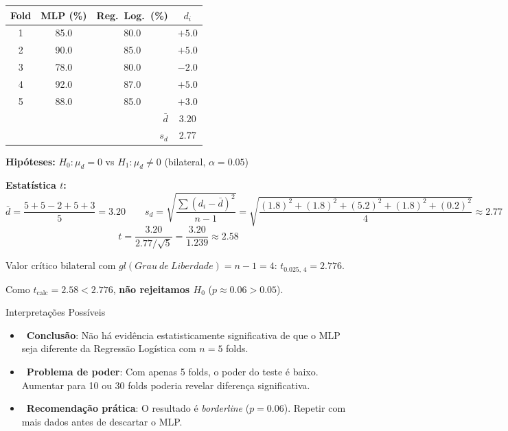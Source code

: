 \documentclass[12pt,a4paper]{article}
\begin{document}
\begin{center}
\begin{tabular}{cccc}
\toprule
Fold & MLP (\%) & Reg.\ Log.\ (\%) & $d_i$ \\
\midrule
1 & 85{.}0 & 80{.}0 & $+5{.}0$ \\
2 & 90{.}0 & 85{.}0 & $+5{.}0$ \\
3 & 78{.}0 & 80{.}0 & $-2{.}0$ \\
4 & 92{.}0 & 87{.}0 & $+5{.}0$ \\
5 & 88{.}0 & 85{.}0 & $+3{.}0$ \\
\midrule
\multicolumn{3}{r}{$\bar{d}$} & $3{.}20$ \\
\multicolumn{3}{r}{$s_d$} & $2{.}77$ \\
\bottomrule
\end{tabular}
\end{center}

\textbf{Hipóteses:} $H_0: \mu_d = 0$ \quad vs \quad $H_1: \mu_d \neq 0$ (bilateral, $\alpha = 0{.}05$)

\textbf{Estatística $t$:}
\[
  \bar{d} = \frac{5+5-2+5+3}{5} = 3{.}20 \qquad
  s_d = \sqrt{\frac{\sum(d_i-\bar{d})^2}{n-1}} = \sqrt{\frac{(1{.}8)^2+(1{.}8)^2+(5{.}2)^2+(1{.}8)^2+(0{.}2)^2}{4}} \approx 2{.}77
\]
\[
  t = \frac{3{.}20}{2{.}77/\sqrt{5}} = \frac{3{.}20}{1{.}239} \approx 2{.}58
\]

Valor crítico bilateral com $gl(Grau\ de\ Liberdade) = n-1 =4$: $t_{0{.}025,\,4} = 2{.}776$.

Como $t_{\text{calc}} = 2{.}58 < 2{.}776$, \textbf{não rejeitamos $H_0$} ($p \approx 0{.}06 > 0{.}05$).

\begin{exemplobox}{Interpretações Possíveis}
\begin{itemize}
  \item {}\ \textbf{Conclusão}: Não há evidência estatisticamente significativa de que o MLP seja diferente da Regressão Logística com $n=5$ folds.
  \item {}\ \textbf{Problema de poder}: Com apenas 5 folds, o poder do teste é baixo. Aumentar para 10 ou 30 folds poderia revelar diferença significativa.
  \item {}\ \textbf{Recomendação prática}: O resultado é \textit{borderline} ($p=0{.}06$). Repetir com mais dados antes de descartar o MLP.
\end{itemize}
\end{exemplobox}
\end{document}
